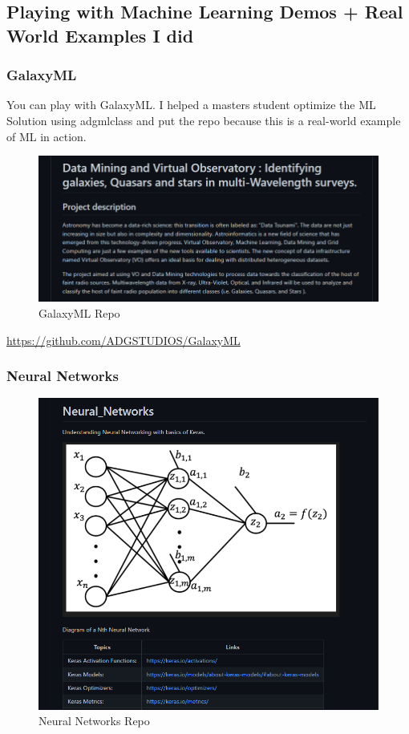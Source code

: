 \subsection{Playing with Machine Learning Demos + Real World Examples I did}

\subsubsection{GalaxyML}

You can play with GalaxyML. I helped a masters student optimize the ML Solution using adgmlclass and put the repo because this is a real-world example of ML in action.  

\begin{figure}[H]
    \includegraphics[width=\linewidth]{images/galaxymlrepo.png}
    \caption{GalaxyML Repo}
    \label{fig:galaxyml}
\end{figure}

\begin{center}
    \url{https://github.com/ADGSTUDIOS/GalaxyML}
\end{center}

\subsubsection{Neural Networks}
\begin{figure}[H]
    \includegraphics[width=\linewidth]{images/neuralnetworksrepo.png}
    \caption{Neural Networks Repo}
    \label{fig:neuralnetworks}
\end{figure}

